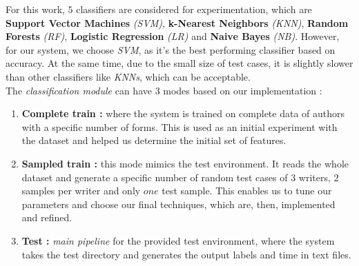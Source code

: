 For this work, $5$ classifiers are considered for experimentation, which are \textbf{Support Vector Machines} \emph{(SVM)}, \textbf{k-Nearest Neighbors} \emph{(KNN)}, \textbf{Random Forests} \emph{(RF)}, \textbf{Logistic Regression} \emph{(LR)} and \textbf{Naive Bayes} \emph{(NB)}. However, for our system, we choose \emph{SVM}, as it's the best performing classifier based on accuracy. At the same time, due to the small size of test cases, it is slightly slower than other classifiers like \emph{KNNs}, which can be acceptable. \\

The \emph{classification module} can have $3$ modes based on our implementation :
\begin{enumerate}
    \item \textbf{Complete train :} where the system is trained on complete data of authors with a specific number of forms. This is used as an initial experiment with the dataset and helped us determine the initial set of features.
    \item \textbf{Sampled train :} this mode mimics the test environment. It reads the whole dataset and generate a specific number of random test cases of $3$ writers, $2$ samples per writer and only $one$ test sample. This enables us to tune our parameters and choose our final techniques, which are, then, implemented and refined.
    \item \textbf{Test :} \emph{main pipeline} for the provided test environment, where the system takes the test directory and generates the output labels and time in text files.
\end{enumerate}

